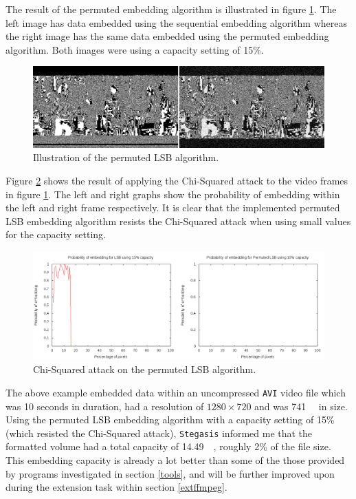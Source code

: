\documentclass[paper=a4, fontsize=11pt,twoside]{scrartcl}
\numberwithin{table}{section}
\numberwithin{figure}{section}
\numberwithin{algorithm}{section}
\begin{document}
The result of the permuted embedding algorithm is illustrated in figure \ref{lsbp_ill}. The left image has data embedded using the sequential embedding algorithm whereas the right image has the same data embedded using the permuted embedding algorithm. Both images were using a capacity setting of 15\%.

\begin{figure}[here]
\centerline{\includegraphics[width=\textwidth]{images/lsbp_ill.png}}
\caption{Illustration of the permuted LSB algorithm.}
\label{lsbp_ill}
\end{figure}

Figure \ref{lsbp_chi} shows the result of applying the Chi-Squared attack to the video frames in figure \ref{lsbp_ill}. The left and right graphs show the probability of embedding within the left and right frame respectively. It is clear that the implemented permuted LSB embedding algorithm resists the Chi-Squared attack when using small values for the capacity setting. 

\begin{figure}[here]
\centerline{\includegraphics[width=\textwidth]{images/lsbp_chi.png}}
\caption{Chi-Squared attack on the permuted LSB algorithm.}
\label{lsbp_chi}
\end{figure}

\noindent
The above example embedded data within an uncompressed \texttt{AVI} video file which was 10 seconds in duration, had a resolution of $1280\times720$ and was \SI{741}{\mega\byte} in size. Using the permuted LSB embedding algorithm with a capacity setting of 15\% (which resisted the Chi-Squared attack), \texttt{Stegasis} informed me that the formatted volume had a total capacity of \SI{14.49}{\mega\byte}, roughly 2\% of the file size. This embedding capacity is already a lot better than some of the those provided by programs investigated in section \ref{tools}, and will be further improved upon during the extension task within section \ref{extffmpeg}.
\end{document}
